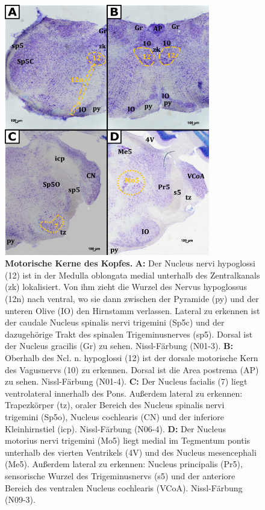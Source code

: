 \documentclass[12pt,a4paper,pdftex]{article}
\begin{document}
\begin{figure}[H]
    \centering
    \includegraphics[width=0.8\textwidth]{pictures/Bilder_Laura/Kerne_motorik_kopf_N01_3_N01_4_N06_4_N09_3.png}
    \caption[Motorische Kerne des Kopfes]{\textbf{Motorische Kerne des Kopfes.} \textbf{A:} Der Nucleus nervi hypoglossi (12) ist in der Medulla oblongata medial unterhalb des Zentralkanals (zk) lokalisiert. Von ihm zieht die Wurzel des Nervus hypoglossus (12n) nach ventral, wo sie dann zwischen der Pyramide (py) und der unteren Olive (IO) den Hirnstamm verlassen. Lateral zu erkennen ist der caudale Nucleus spinalis nervi trigemini (Sp5c) und der dazugehörige Trakt des spinalen Trigeminusnerves (sp5). Dorsal ist der Nucleus gracilis (Gr) zu sehen. Nissl-Färbung (N01-3). \textbf{B:} Oberhalb des Ncl. n. hypoglossi (12) ist der dorsale motorische Kern des Vagusnervs (10) zu erkennen. Dorsal ist die Area postrema (AP) zu sehen. Nissl-Färbung (N01-4). \textbf{C:} Der Nucleus facialis (7) liegt ventrolateral innerhalb des Pons. Außerdem lateral zu erkennen: Trapezkörper (tz), oraler Bereich des Nucleus spinalis nervi trigemini (Sp5o), Nucleus cochlearis (CN) und der inferiore Kleinhirnstiel (icp). Nissl-Färbung (N06-4). \textbf{D:} Der Nucleus motorius nervi trigemini (Mo5) liegt medial im Tegmentum pontis unterhalb des vierten Ventrikels (4V) und des Nucleus mesencephali (Me5). Außerdem lateral zu erkennen: Nucleus principalis (Pr5), sensorische Wurzel des Trigeminusnervs (s5) und der anteriore Bereich des ventralen Nucleus cochlearis (VCoA). Nissl-Färbung (N09-3).}
    \label{fig:kerne_kopfmotorik}
\end{figure}
\end{document}
